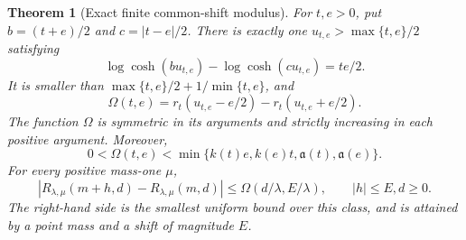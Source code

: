 \documentclass[11pt]{article}
\newtheorem{theorem}{Theorem}
\begin{document}
\begin{theorem}[Exact finite common-shift modulus]
\label{thm:sharp-finite-common-shift}
For $t,e>0$, put $b=(t+e)/2$ and $c=|t-e|/2$. There is exactly one
$u_{t,e}>\max\{t,e\}/2$ satisfying
\begin{equation}
 \log\cosh(bu_{t,e})-\log\cosh(cu_{t,e})=te/2.
 \label{eq:sharp-Omega-root}
\end{equation}
It is smaller than $\max\{t,e\}/2+1/\min\{t,e\}$, and
\begin{equation}
 \Omega(t,e)=r_t(u_{t,e}-e/2)-r_t(u_{t,e}+e/2).
 \label{eq:sharp-Omega-evaluation}
\end{equation}
The function $\Omega$ is symmetric in its arguments and strictly
increasing in each positive argument. Moreover,
\begin{equation}
 0<\Omega(t,e)<\min\{k(t)e,k(e)t,\mathfrak a(t),\mathfrak a(e)\}.
 \label{eq:sharp-Omega-comparison}
\end{equation}
For every positive mass-one $\mu$,
\begin{equation}
 |R_{\lambda,\mu}(m+h,d)-R_{\lambda,\mu}(m,d)|
 \leq\Omega(d/\lambda,E/\lambda),\qquad |h|\leq E, d\geq0.
 \label{eq:sharp-Omega-mixture}
\end{equation}
The right-hand side is the smallest uniform bound over this class,
and is attained by a point mass and a shift of magnitude $E$.
\end{theorem}
\end{document}
